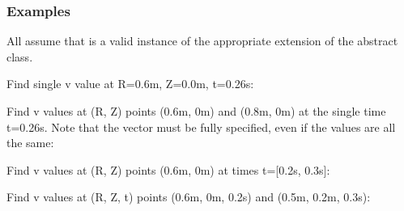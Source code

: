 \documentclass[letterpaper,10pt,english]{sphinxmanual}
\begin{document}
\begin{fulllineitems}
\begin{fulllineitems}
\begin{quote}
\begin{description}
\begin{itemize}
\end{itemize}


\end{description}\end{quote}
\subsubsection*{Examples}

All assume that  is a valid instance of the
appropriate extension of the {\hyperref[\detokenize{eqtools:eqtools.core.Equilibrium}]{}} abstract class.

Find single v value at R=0.6m, Z=0.0m, t=0.26s:

\begin{sphinxVerbatim}[commandchars=\\\{\}]
    
\end{sphinxVerbatim}

Find v values at (R, Z) points (0.6m, 0m) and (0.8m, 0m) at the
single time t=0.26s. Note that the  vector must be fully specified,
even if the values are all the same:

\begin{sphinxVerbatim}[commandchars=\\\{\}]
  \PYG{p}{[} \PYG{p}{]} \PYG{p}{[} \PYG{p}{]} 
\end{sphinxVerbatim}

Find v values at (R, Z) points (0.6m, 0m) at times t={[}0.2s, 0.3s{]}:

\begin{sphinxVerbatim}[commandchars=\\\{\}]
    \PYG{p}{[} \PYG{p}{]}
\end{sphinxVerbatim}

Find v values at (R, Z, t) points (0.6m, 0m, 0.2s) and (0.5m, 0.2m, 0.3s):


\end{fulllineitems}
\end{fulllineitems}
\end{document}

